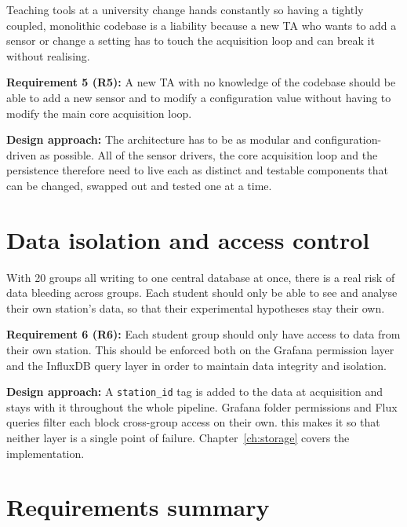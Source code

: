 Teaching tools at a university change hands constantly so having a tightly coupled, monolithic codebase is a liability because a new TA who wants to add a sensor or change a setting has to touch the acquisition loop and can break it without realising.

\textbf{Requirement 5 (R5):} A new TA with no knowledge of the codebase should be able to add a new sensor and to modify a configuration value without having to modify the main core acquisition loop.

\textbf{Design approach:} The architecture has to be as modular and configuration-driven as possible. All of the sensor drivers, the core acquisition loop and the persistence therefore need to live each as distinct and testable components that can be changed, swapped out and tested one at a time.

\section{Data isolation and access control}

With 20 groups all writing to one central database at once, there is a real risk of data bleeding across groups. Each student should only be able to see and analyse their own station's data, so that their experimental hypotheses stay their own.

\textbf{Requirement 6 (R6):} Each student group should only have access to data from their own station. This should be enforced both on the Grafana permission layer and the InfluxDB query layer in order to maintain data integrity and isolation.

\textbf{Design approach:} A \texttt{station\_id} tag is added to the data at acquisition and stays with it throughout the whole pipeline. Grafana folder permissions and Flux queries filter each block cross-group access on their own. this makes it so that neither layer is a single point of failure. Chapter~\ref{ch:storage} covers the implementation.

\section{Requirements summary}

